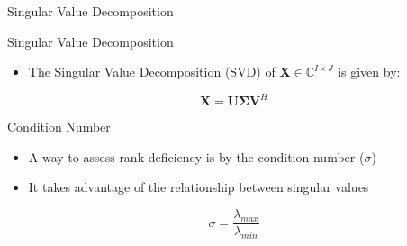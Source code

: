 \documentclass{beamer}
\begin{document}
	\begin{frame}{Singular Value Decomposition}
		
		\begin{block}{Singular Value Decomposition}
			\begin{itemize}
				\item The Singular Value Decomposition (SVD) of ${\mathbf{X}} \in \mathbb{C}^{I\times J}$ is given by:
			\end{itemize}
		\end{block}
		\vspace{-10pt}
		\begin{equation}
			 {\mathbf{X}} = {\mathbf{U}} {\mathbf{\Sigma}} {\mathbf{V}}^H
		\end{equation}
		\vspace{-10pt}
		\begin{block}{Condition Number}
			\begin{itemize}
				\item A way to assess rank-deficiency is by the condition number ($\sigma$)
				\item It takes advantage of the relationship between singular values
			\end{itemize}
		\end{block}
		\vspace{-10pt}
		\begin{equation}
            \sigma = \frac{\lambda_{max}}{\lambda_{min}}
		\end{equation}
	\end{frame}
\end{document}
